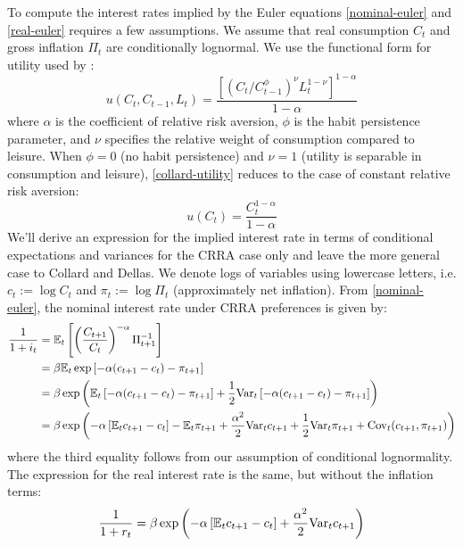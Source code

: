 To compute the interest rates implied by the Euler equations \eqref{nominal-euler} and \eqref{real-euler} requires a few assumptions. We assume that real consumption $C_t$ and gross inflation $\Pi_t$ are conditionally lognormal. We use the functional form for utility used by \cite{collard11}:
\begin{equation}
\label{collard-utility}
u(C_t, C_{t-1}, L_t) = \frac{[(C_t/C_{t-1}^\phi)^\nu L_t^{1-\nu}]^{1-\alpha}}{1-\alpha}
\end{equation}
where $\alpha$ is the coefficient of relative risk aversion, $\phi$ is the habit persistence parameter, and $\nu$ specifies the relative weight of consumption compared to leisure. When $\phi = 0$ (no habit persistence) and $\nu = 1$ (utility is separable in consumption and leisure), \eqref{collard-utility} reduces to the case of constant relative risk aversion:
\begin{equation}
\label{crra-utility}
u(C_t) = \frac{C_t^{1-\alpha}}{1-\alpha}
\end{equation}
We'll derive an expression for the implied interest rate in terms of conditional expectations and variances for the CRRA case only and leave the more general case to Collard and Dellas. We denote logs of variables using lowercase letters, i.e. $c_t := \log C_t$ and $\pi_t := \log \Pi_t$ (approximately net inflation). From \eqref{nominal-euler}, the nominal interest rate under CRRA preferences is given by:
\begin{align}
\label{nominal-euler-crra}
\frac{1}{1 + i_t} &= \mathbb{E}_t \left[  \left( \frac{C_{t+1}}{C_t} \right)^{-\alpha} \Pi_{t+1}^{-1}  \right] \\
  &= \beta \mathbb{E}_t \exp \left[  -\alpha(c_{t+1} - c_t) - \pi_{t+1}  \right] \nonumber \\
  &= \beta \exp \left(  \mathbb{E}_t \left[  -\alpha(c_{t+1} - c_t) - \pi_{t+1}  \right] + \frac{1}{2} \mathrm{Var}_t \left[  -\alpha(c_{t+1} - c_t) - \pi_{t+1}  \right]  \right) \nonumber \\
  &= \beta \exp \left(  -\alpha \left[  \mathbb{E}_t c_{t+1} - c_t  \right] - \mathbb{E}_t \pi_{t+1} + \frac{\alpha^2}{2} \mathrm{Var}_t c_{t+1} + \frac{1}{2} \mathrm{Var}_t \pi_{t+1} + \mathrm{Cov}_t(c_{t+1}, \pi_{t+1})  \right) \nonumber
\end{align}
where the third equality follows from our assumption of conditional lognormality. The expression for the real interest rate is the same, but without the inflation terms: $$\frac{1}{1 + r_t} = \beta \exp \left(  -\alpha \left[  \mathbb{E}_t c_{t+1} - c_t  \right] + \frac{\alpha^2}{2} \mathrm{Var}_t c_{t+1}  \right)$$

